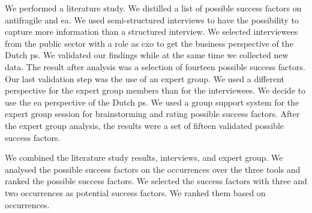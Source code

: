 We performed a literature study. We distilled a list of possible success factors on \gls{antifragile} and \gls{ea}.  We used semi-structured interviews to have the possibility to capture more information than a structured interview. We selected interviewees from the public sector with a role as \gls{cxo} to get the business perspective of the Dutch \gls{ps}. We validated our findings while at the same time we collected new data. The result after analysis was a selection of fourteen possible success factors. Our last validation step was the use of an expert group. We used a different perspective for the expert group members than for the interviewees. We decide to use the \gls{ea} perspective of the Dutch \gls{ps}. We used a group support system for the expert group session for brainstorming and rating possible success factors. After the expert group analysis, the results were a set of fifteen validated possible success factors.

We combined the literature study results, interviews, and expert group. We analysed the possible success factors on the occurrences over the three tools and ranked the possible success factors. We selected the success factors with three and two occurrences as potential success factors. We ranked them based on occurrences.

